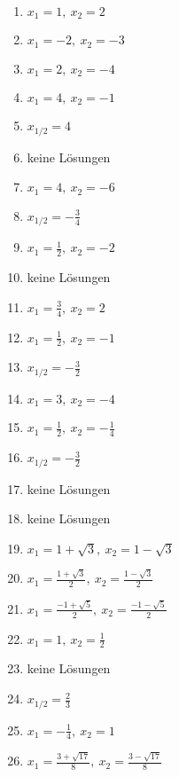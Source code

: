 \newpage
\begin{Answer}[ref=mitternachtA1]\\
	\begin{minipage}{\textwidth}
		\begin{minipage}{0.44\textwidth}
			\begin{enumerate}[label=\alph*)]
				\item \(x_1=1,\ x_2=2\)
				\item \(x_1=-2,\ x_2=-3\)
				\item \(x_1=2,\ x_2=-4\)
				\item \(x_1=4,\ x_2=-1\)
				\item \(x_{1/2}=4\)
				\item keine Lösungen
				\item \(x_1=4,\ x_2=-6\)
				\item \(x_{1/2}=-\frac{3}{4}\)
				\item \(x_1=\frac{1}{2},\ x_2=-2\)
				\item keine Lösungen
				\item \(x_1=\frac{3}{4},\ x_2=2\)
				\item \(x_1=\frac{1}{2},\ x_2=-1\)
				\item \(x_{1/2}=-\frac{3}{2}\)
			\end{enumerate}
		\end{minipage}
		\begin{minipage}{0.54\textwidth}
			\begin{enumerate}[label=\alph*)]
				\setcounter{enumi}{13}
				\item \(x_1=3,\ x_2=-4\)
				\item \(x_1=\frac{1}{2},\ x_2=-\frac{1}{4}\)
				\item \(x_{1/2}=-\frac{3}{2}\)
				\item keine Lösungen
				\item keine Lösungen
				\item \(x_1=1+\sqrt{3},\ x_2=1-\sqrt{3}\)
				\item \(x_1=\frac{1+\sqrt{3}}{2},\ x_2=\frac{1-\sqrt{3}}{2}\)
				\item \(x_1=\frac{-1+\sqrt{5}}{2},\ x_2=\frac{-1-\sqrt{5}}{2}\)
				\item \(x_1=1,\ x_2=\frac{1}{2}\)
				\item keine Lösungen
				\item \(x_{1/2}=\frac{2}{3}\)
				\item \(x_1=-\frac{1}{4},\ x_2=1\)
				\item \(x_1=\frac{3+\sqrt{17}}{8},\ x_2=\frac{3-\sqrt{17}}{8}\)
			\end{enumerate}
		\end{minipage}
	\end{minipage}
\end{Answer}